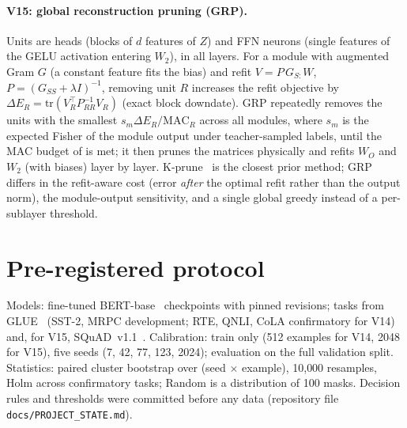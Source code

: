 \documentclass[11pt]{article}
\begin{document}
\paragraph{V15: global reconstruction pruning (GRP).} Units are heads (blocks of $d$ features of $Z$) and FFN neurons
(single features of the GELU activation entering $W_2$), in all layers. For a module with augmented Gram $G$ (a constant
feature fits the bias) and refit $V=P\,G_{S:}W$, $P=(G_{SS}+\lambda I)^{-1}$, removing unit $R$ increases the refit
objective by $\Delta E_R=\mathrm{tr}(V_R^\top P_{RR}^{-1}V_R)$ (exact block downdate). GRP repeatedly removes the units
with the smallest $s_m\Delta E_R/\mathrm{MAC}_R$ across all modules, where $s_m$ is the expected Fisher of the module
output under teacher-sampled labels, until the MAC budget of \citet{kwon2022fast} is met; it then prunes the matrices
physically and refits $W_O$ and $W_2$ (with biases) layer by layer. K-prune~\citep{park2024kprune} is the closest prior
method; GRP differs in the refit-aware cost (error \emph{after} the optimal refit rather than the output norm), the
module-output sensitivity, and a single global greedy instead of a per-sublayer threshold.

\section{Pre-registered protocol}\label{sec:prereg}
Models: fine-tuned BERT-base~\citep{devlin2019bert} checkpoints with pinned revisions; tasks from
GLUE~\citep{wang2018glue} (SST-2, MRPC development; RTE, QNLI, CoLA confirmatory for V14) and, for V15,
SQuAD~v1.1~\citep{rajpurkar2016squad}. Calibration: train only (512 examples for V14, 2048 for V15), five seeds
(7, 42, 77, 123, 2024); evaluation on the full validation split. Statistics: paired cluster bootstrap over
(seed $\times$ example), 10{,}000 resamples, Holm across confirmatory tasks; Random is a distribution of 100 masks.
Decision rules and thresholds were committed before any data (repository file \texttt{docs/PROJECT\_STATE.md}).
\end{document}
